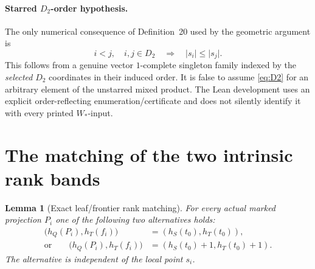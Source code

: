 \documentclass[11pt]{article}
\newtheorem{lemma}[theorem]{Lemma}
\newcommand{\htS}{h_S}
\newcommand{\htT}{h_T}
\newcommand{\htQ}{h_Q}
\newcommand{\len}[1]{\lvert #1\rvert}
\begin{document}
\paragraph{Starred \(D_2\)-order hypothesis.}
The only numerical consequence of Definition~20 used
by the geometric argument is
\begin{equation}\label{eq:D2}
  i<j,\quad i,j\in D_2
       \quad\Longrightarrow\quad
       \len{s_i}\le\len{s_j}.
\end{equation}
This follows from a genuine vector \(1\)-complete
singleton family indexed by the \emph{selected} \(D_2\)
coordinates in their induced order. It is false to
assume \eqref{eq:D2} for an arbitrary element of the
unstarred mixed product. The Lean development uses an
explicit order-reflecting enumeration/certificate and
does not silently identify it with every printed
\(W_*\)-input.

\section*{The matching of the two intrinsic rank bands}

\begin{lemma}[Exact leaf/frontier rank matching]
\label{lem:bands}
For every actual marked projection \(P_i\) one of the
following two alternatives holds:
\[
\begin{aligned}
 \bigl(\htQ(P_i),\htT(f_i)\bigr)
      &=(\htS(t_0),\htT(t_0)),\\
 \text{or}\qquad
 \bigl(\htQ(P_i),\htT(f_i)\bigr)
      &=(\htS(t_0)+1,\htT(t_0)+1).
\end{aligned}
\]
The alternative is independent of the local point \(s_i\).
\end{lemma}
\end{document}
